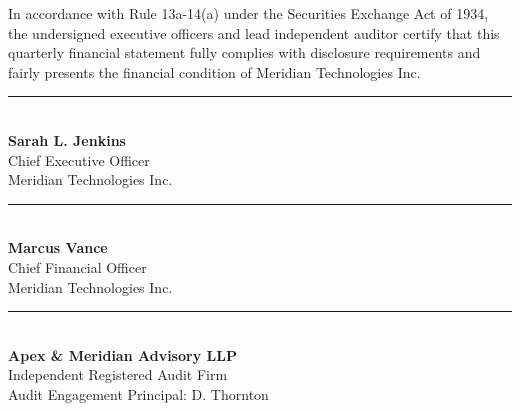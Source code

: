 \documentclass[10pt,a4paper]{article}
\begin{document}
\vspace{6pt}

\begin{tcolorbox}[
  enhanced,
  colback=LightBg,
  colframe=BrandNavy,
  boxrule=1pt,
  arc=2mm,
  title={\bfseries\color{white}\faCheckCircle\ Management Certification \& Auditor Attestation},
  coltitle=white,
  fonttitle=\bfseries\small,
  top=6pt, bottom=6pt
]
  \small
  In accordance with Rule 13a-14(a) under the Securities Exchange Act of 1934, the undersigned executive officers and lead independent auditor certify that this quarterly financial statement fully complies with disclosure requirements and fairly presents the financial condition of Meridian Technologies Inc.

  \vspace{10pt}
  \begin{minipage}[t]{0.31\textwidth}
    \rule{\textwidth}{0.5pt}\\[2pt]
    \textbf{Sarah L. Jenkins}\\
    Chief Executive Officer\\
    {\tiny Meridian Technologies Inc.}
  \end{minipage}\hfill
  \begin{minipage}[t]{0.31\textwidth}
    \rule{\textwidth}{0.5pt}\\[2pt]
    \textbf{Marcus Vance}\\
    Chief Financial Officer\\
    {\tiny Meridian Technologies Inc.}
  \end{minipage}\hfill
  \begin{minipage}[t]{0.31\textwidth}
    \rule{\textwidth}{0.5pt}\\[2pt]
    \textbf{Apex \& Meridian Advisory LLP}\\
    Independent Registered Audit Firm\\
    {\tiny Audit Engagement Principal: D. Thornton}
  \end{minipage}
\end{tcolorbox}
\end{document}
